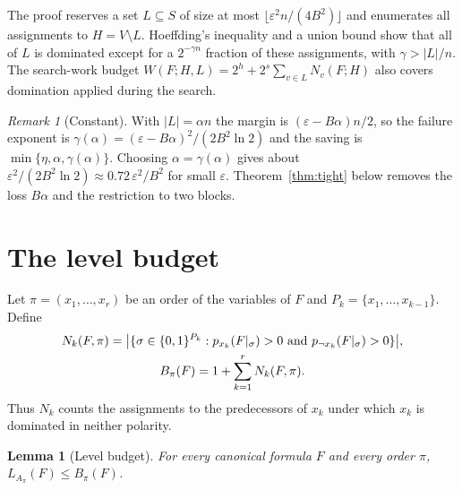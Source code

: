 \documentclass[11pt,a4paper]{article}
\newtheorem{lemma}[theorem]{Lemma}
\theoremstyle{remark}
\newtheorem{remark}[theorem]{Remark}
\begin{document}
The proof reserves a set $L\subseteq S$ of size at most
$\lfloor\varepsilon^2n/(4B^2)\rfloor$ and enumerates all assignments to
$H=V\setminus L$. Hoeffding's inequality and a union bound show that all of
$L$ is dominated except for a $2^{-\gamma n}$ fraction of these assignments,
with $\gamma>|L|/n$. The search-work budget
$W(F;H,L)=2^h+2^s\sum_{v\in L}N_v(F;H)$ also covers domination applied during
the search.

\begin{remark}[Constant]\label{rem:alpha}
With $|L|=\alpha n$ the margin is $(\varepsilon-B\alpha)n/2$, so the failure
exponent is $\gamma(\alpha)=(\varepsilon-B\alpha)^2/(2B^2\ln2)$ and the saving
is $\min\{\eta,\alpha,\gamma(\alpha)\}$. Choosing $\alpha=\gamma(\alpha)$ gives
about $\varepsilon^2/(2B^2\ln2)\approx0.72\,\varepsilon^2/B^2$ for small
$\varepsilon$. Theorem~\ref{thm:tight} below removes the loss $B\alpha$ and
the restriction to two blocks.
\end{remark}

\section{The level budget}\label{sec:budget}

Let $\pi=(x_1,\dots,x_r)$ be an order of the variables of $F$ and
$P_k=\{x_1,\dots,x_{k-1}\}$. Define
\begin{gather}
 N_k(F,\pi)=\bigl|\{\sigma\in\{0,1\}^{P_k}:
 p_{x_k}(F|_\sigma)>0\text{ and }p_{\neg x_k}(F|_\sigma)>0\}\bigr|,
 \notag\\
 B_\pi(F)=1+\sum_{k=1}^rN_k(F,\pi).
 \label{eq:budget}
\end{gather}
Thus $N_k$ counts the assignments to the predecessors of $x_k$ under which
$x_k$ is dominated in neither polarity.

\begin{lemma}[Level budget]\label{lem:level}
For every canonical formula $F$ and every order $\pi$,
$L_{A_\pi}(F)\le B_\pi(F)$.
\end{lemma}
\end{document}
